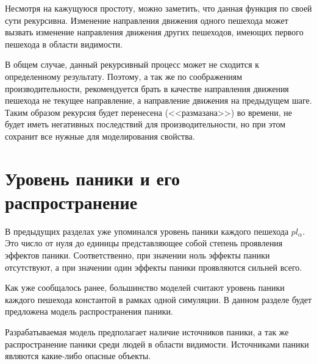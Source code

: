 Несмотря на кажущуюся простоту, можно заметить, что данная функция по своей сути рекурсивна.
Изменение направления движения одного пешехода может вызвать изменение направления движения других пешеходов,
имеющих первого пешехода в области видимости.

В общем случае, данный рекурсивный процесс может не сходится к определенному результату.
Поэтому, а так же по соображениям производительности, рекомендуется брать в качестве направления движения пешехода не текущее направление,
а направление движения на предыдущем шаге.
Таким образом рекурсия будет перенесена (<<размазана>>) во времени, не будет иметь негативных последствий для производительности,
но при этом сохранит все нужные для моделирования свойства.

\section{Уровень паники и его распространение}
\label{sub:model:panic_level}

В предыдущих разделах уже упоминался уровень паники каждого пешехода $pl_\alpha$.
Это число от нуля до единицы представляющее собой степень проявления эффектов паники.
Соответственно, при значении ноль эффекты паники отсутствуют, а при значении один эффекты паники проявляются сильней всего.

Как уже сообщалось ранее, большинство моделей считают уровень паники каждого пешехода константой в рамках одной симуляции.
В данном разделе будет предложена модель распространения паники.

Разрабатываемая модель предполагает наличие источников паники, а так же распространение паники среди людей в области видимости.
Источниками паники являются какие-либо опасные объекты.


